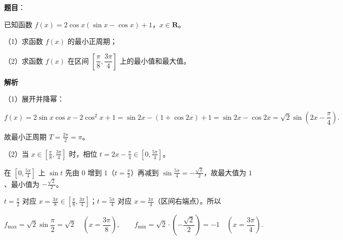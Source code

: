 \begin{answer}

\textbf{题目}：

已知函数 $f(x)=2\cos x(\sin x-\cos x)+1$，$x\in\mathbf{R}$。

（1）求函数 $f(x)$ 的最小正周期；

（2）求函数 $f(x)$ 在区间 $\left[\dfrac{\pi}{8},\dfrac{3\pi}{4}\right]$ 上的最小值和最大值。

\textbf{解析}

（1）展开并降幂：

\nopagebreak[4]
\[f(x)=2\sin x\cos x-2\cos^2x+1=\sin2x-\left(1+\cos2x\right)+1=\sin2x-\cos2x=\sqrt2\sin\left(2x-\frac\pi4\right).\]

故最小正周期 $T=\frac{2\pi}2=\pi$。

（2）当 $x\in\left[\frac\pi8,\frac{3\pi}4\right]$ 时，相位 $t=2x-\frac\pi4\in\left[0,\frac{5\pi}4\right]$。

在 $\left[0,\frac{5\pi}4\right]$ 上 $\sin t$ 先由 $0$ 增到 $1$（$t=\frac\pi2$）再减到 $\sin\frac{5\pi}4=-\frac{\sqrt2}2$，故最大值为 $1$、最小值为 $-\frac{\sqrt2}2$。

$t=\frac\pi2$ 对应 $x=\frac{3\pi}8\in\left[\frac\pi8,\frac{3\pi}4\right]$；$t=\frac{5\pi}4$ 对应 $x=\frac{3\pi}4$（区间右端点）。所以

\nopagebreak[4]
\[f_{\max}=\sqrt2\sin\frac\pi2=\sqrt2\quad\left(x=\frac{3\pi}8\right),\qquad f_{\min}=\sqrt2\cdot\left(-\frac{\sqrt2}2\right)=-1\quad\left(x=\frac{3\pi}4\right).\]


\end{answer}

